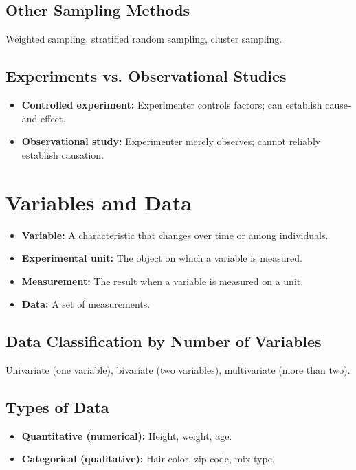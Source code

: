 \documentclass[11pt]{article}
\begin{document}
\subsection*{Other Sampling Methods}
Weighted sampling, stratified random sampling, cluster sampling.

\subsection*{Experiments vs. Observational Studies}
\begin{itemize}[nosep]
    \item \textbf{Controlled experiment:} Experimenter controls factors; can establish cause-and-effect.
    \item \textbf{Observational study:} Experimenter merely observes; cannot reliably establish causation.
\end{itemize}

\section*{Variables and Data}
\begin{itemize}[nosep]
    \item \textbf{Variable:} A characteristic that changes over time or among individuals.
    \item \textbf{Experimental unit:} The object on which a variable is measured.
    \item \textbf{Measurement:} The result when a variable is measured on a unit.
    \item \textbf{Data:} A set of measurements.
\end{itemize}

\subsection*{Data Classification by Number of Variables}
Univariate (one variable), bivariate (two variables), multivariate (more than two).

\subsection*{Types of Data}
\begin{itemize}[nosep]
    \item \textbf{Quantitative (numerical):} Height, weight, age.
    \item \textbf{Categorical (qualitative):} Hair color, zip code, mix type.
\end{itemize}
\end{document}
